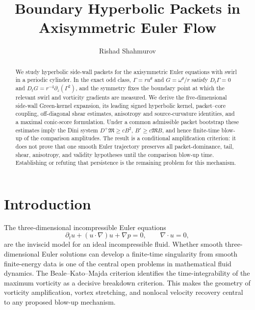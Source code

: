 \documentclass[11pt]{amsart}
\title[Boundary hyperbolic packets]{Boundary Hyperbolic Packets in Axisymmetric Euler Flow}
\author{Rishad Shahmurov}
\begin{document}
\begin{abstract}
We study hyperbolic side-wall packets for the axisymmetric Euler equations with swirl in a periodic cylinder.  In the exact odd class, $\Gamma=ru^\theta$ and $G=\omega^\theta/r$ satisfy $D_t\Gamma=0$ and $D_tG=r^{-4}\partial_z(\Gamma^2)$, and the symmetry fixes the boundary point at which the relevant swirl and vorticity gradients are measured.  We derive the five-dimensional side-wall Green-kernel expansion, its leading signed hyperbolic kernel, packet--core coupling, off-diagonal shear estimates, anisotropy and source-curvature identities, and a maximal conic-score formulation.  Under a common admissible packet bootstrap these estimates imply the Dini system $D^+\mathfrak M\ge cB^2$, $B'\ge c\mathfrak M B$, and hence finite-time blow-up of the comparison amplitudes.  The result is a conditional amplification criterion: it does not prove that one smooth Euler trajectory preserves all packet-dominance, tail, shear, anisotropy, and validity hypotheses until the comparison blow-up time.  Establishing or refuting that persistence is the remaining problem for this mechanism.
\end{abstract}

\maketitle

\tableofcontents

\section{Introduction}

The three-dimensional incompressible Euler equations
\begin{equation}\label{eq:euler}
\partial_tu+(u\cdot\nabla)u+\nabla p=0,
\qquad
\nabla\cdot u=0,
\end{equation}
are the inviscid model for an ideal incompressible fluid.  Whether smooth three-dimensional Euler solutions can develop a finite-time singularity from smooth finite-energy data is one of the central open problems in mathematical fluid dynamics.  The Beale--Kato--Majda criterion \cite{BKM1984} identifies the time-integrability of the maximum vorticity as a decisive breakdown criterion.  This makes the geometry of vorticity amplification, vortex stretching, and nonlocal velocity recovery central to any proposed blow-up mechanism.
\end{document}
